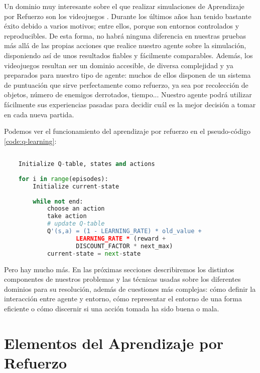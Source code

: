 Un dominio muy interesante sobre el que realizar simulaciones de Aprendizaje por Refuerzo son los videojuegos \citep{Rodriguez2018}. Durante los últimos años han tenido bastante éxito debido a varios motivos; entre ellos, porque son entornos controlados y reproducibles. De esta forma, no habrá ninguna diferencia en nuestras pruebas más allá de las propias acciones que realice nuestro agente sobre la simulación, disponiendo así de unos resultados fiables y fácilmente comparables. Además, los videojuegos resultan ser un dominio accesible, de diversa complejidad y ya preparados para nuestro tipo de agente: muchos de ellos disponen de un sistema de puntuación que sirve perfectamente como refuerzo, ya sea por recolección de objetos, número de enemigos derrotados, tiempo... Nuestro agente podrá utilizar fácilmente sus experiencias pasadas para decidir cuál es la mejor decisión a tomar en cada nueva partida.

Podemos ver el funcionamiento del aprendizaje por refuerzo en el pseudo-código \ref{code:q-learning}:

\begin{minipage}{0.9\linewidth}%
    \begin{lstlisting}[frame=tb, language=python, caption=Pseudocódigo Aprendizaje por Refuerzo,   inputencoding=latin1, label={code:q-learning}]
    
    Initialize Q-table, states and actions
    
    for i in range(episodes):
        Initialize current-state
        
        while not end:
            choose an action
            take action
            # update Q-table
            Q'(s,a) = (1 - LEARNING_RATE) * old_value + 
                    LEARNING_RATE * (reward + 
                    DISCOUNT_FACTOR * next_max)
            current-state = next-state
    \end{lstlisting}%
\end{minipage}

Pero hay mucho más. En las próximas secciones describiremos los distintos componentes de nuestros problemas y las técnicas usadas sobre los diferentes dominios para su resolución, además de cuestiones más complejas: cómo definir la interacción entre agente y entorno, cómo representar el entorno de una forma eficiente o cómo discernir si una acción tomada ha sido buena o mala.


\section{Elementos del Aprendizaje por Refuerzo}

